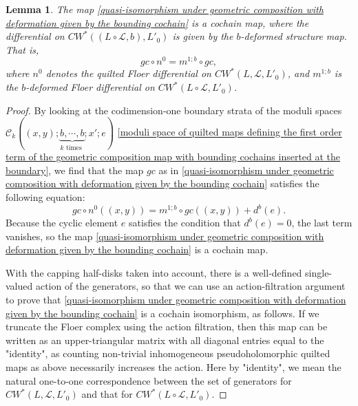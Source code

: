\documentclass{amsart}
\newtheorem{lemma}[theorem]{Lemma}
\numberwithin{equation}{section}
\numberwithin{figure}{section}
\begin{document}
\begin{lemma}
	The map \eqref{quasi-isomorphism under geometric composition with deformation given by the bounding cochain} is a cochain map, where the differential on $CW^{*}((L \circ \mathcal{L}, b), L'_{0})$ is given by the $b$-deformed structure map. That is,
\begin{equation*}
gc \circ n^{0} = m^{1; b} \circ gc,
\end{equation*}
where $n^{0}$ denotes the quilted Floer differential on $CW^{*}(L, \mathcal{L}, L'_{0})$, and $m^{1; b}$ is the $b$-deformed Floer differential on $CW^{*}(L \circ \mathcal{L}, L'_{0})$.
\end{lemma}
\begin{proof}
	By looking at the codimension-one boundary strata of the moduli spaces $\mathcal{C}_{k}((x, y); \underbrace{b, \cdots, b}_{k \text{ times }}; x'; e)$ \eqref{moduli space of quilted maps defining the first order term of the geometric composition map with bounding cochains inserted at the boundary}, we find that the map $gc$ as in \eqref{quasi-isomorphism under geometric composition with deformation given by the bounding cochain} satisfies the following equation:
\begin{equation}
gc \circ n^{0}((x, y)) = m^{1; b} \circ gc((x, y)) + d^{b}(e).
\end{equation}
Because the cyclic element $e$ satisfies the condition that $d^{b}(e) = 0$, the last term vanishes, so the map \eqref{quasi-isomorphism under geometric composition with deformation given by the bounding cochain} is a cochain map. \par
	With the capping half-disks taken into account, there is a well-defined single-valued action of the generators, so that we can use an action-filtration argument to prove that \eqref{quasi-isomorphism under geometric composition with deformation given by the bounding cochain} is a cochain isomorphism, as follows. If we truncate the Floer complex using the action filtration, then this map can be written as an upper-triangular matrix with all diagonal entries equal to the "identity", as counting non-trivial inhomogeneous pseudoholomorphic quilted maps as above necessarily increases the action. Here by "identity", we mean the natural one-to-one correspondence between the set of generators for $CW^{*}(L, \mathcal{L}, L'_{0})$ and that for $CW^{*}(L \circ \mathcal{L}, L'_{0})$. \par
\end{proof}
\end{document}
